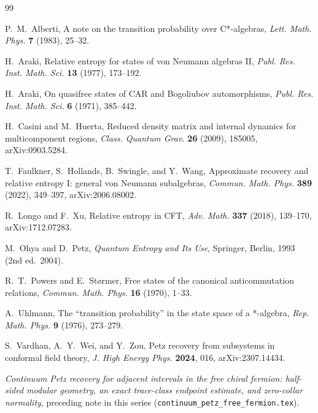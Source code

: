 \begin{thebibliography}{99}

P.~M.~Alberti,
\newblock A note on the transition probability over C*-algebras,
\newblock \emph{Lett. Math. Phys.} \textbf{7} (1983), 25--32.

H.~Araki,
\newblock Relative entropy for states of von Neumann algebras II,
\newblock \emph{Publ. Res. Inst. Math. Sci.} \textbf{13} (1977), 173--192.

H.~Araki,
\newblock On quasifree states of CAR and Bogoliubov automorphisms,
\newblock \emph{Publ. Res. Inst. Math. Sci.} \textbf{6} (1971), 385--442.

H.~Casini and M.~Huerta,
\newblock Reduced density matrix and internal dynamics for multicomponent regions,
\newblock \emph{Class. Quantum Grav.} \textbf{26} (2009), 185005, arXiv:0903.5284.

T.~Faulkner, S.~Hollands, B.~Swingle, and Y.~Wang,
\newblock Approximate recovery and relative entropy I: general von Neumann subalgebras,
\newblock \emph{Commun. Math. Phys.} \textbf{389} (2022), 349--397, arXiv:2006.08002.

R.~Longo and F.~Xu,
\newblock Relative entropy in CFT,
\newblock \emph{Adv. Math.} \textbf{337} (2018), 139--170, arXiv:1712.07283.

M.~Ohya and D.~Petz,
\newblock \emph{Quantum Entropy and Its Use},
\newblock Springer, Berlin, 1993 (2nd ed.\ 2004).

R.~T.~Powers and E.~St{\o}rmer,
\newblock Free states of the canonical anticommutation relations,
\newblock \emph{Commun. Math. Phys.} \textbf{16} (1970), 1--33.

A.~Uhlmann,
\newblock The ``transition probability'' in the state space of a *-algebra,
\newblock \emph{Rep. Math. Phys.} \textbf{9} (1976), 273--279.

S.~Vardhan, A.~Y.~Wei, and Y.~Zou,
\newblock Petz recovery from subsystems in conformal field theory,
\newblock \emph{J. High Energy Phys.} \textbf{2024}, 016, arXiv:2307.14434.

\emph{Continuum Petz recovery for adjacent intervals in the free chiral fermion: half-sided modular geometry, an exact trace-class endpoint estimate, and zero-collar normality},
\newblock preceding note in this series (\texttt{continuum\_petz\_free\_fermion.tex}).

\end{thebibliography}
